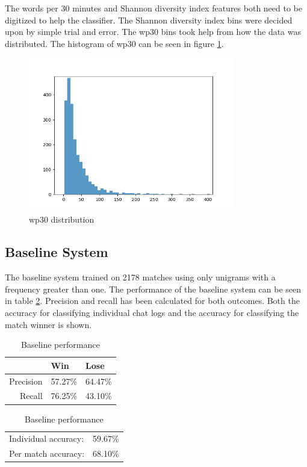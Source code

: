 \documentclass[12pt,a4paper]{article}
\begin{document}
The words per 30 minutes and Shannon diversity index features both need to be digitized
to help the classifier. The Shannon diversity index bins were decided upon by simple
trial and error. The wp30 bins took help from how the data was distributed.
The histogram of wp30 can be seen in figure \ref{fig:wp30}.
\begin{figure}[h]
    \centering
    \includegraphics[width=0.8\textwidth]{wp30.png}
    \caption{wp30 distribution}
    \label{fig:wp30}
\end{figure}

\subsection{Baseline System}
The baseline system trained on 2178 matches using only unigrams with a frequency greater than one.
The performance of the baseline system can be seen in table \ref{tab:baseline}.
Precision and recall has been calculated for both outcomes.
Both the accuracy for classifying individual chat logs and the accuracy for
classifying the match winner is shown.

\begin{table}[h]
    \begin{center}
\begin{tabular}{ r | l l }
                & Win       & Lose \\
    \hline
    Precision   & 57.27\%   & 64.47\% \\
    Recall      & 76.25\%   & 43.10\% \\
    
\end{tabular}

\rule{0pt}{8ex}    
\begin{tabular}{ l l }
    Individual accuracy: & 59.67\% \\
    Per match accuracy:  & 68.10\%\\
\end{tabular}
\caption{Baseline performance}
\label{tab:baseline}
\end{center}
\end{table}
\end{document}
